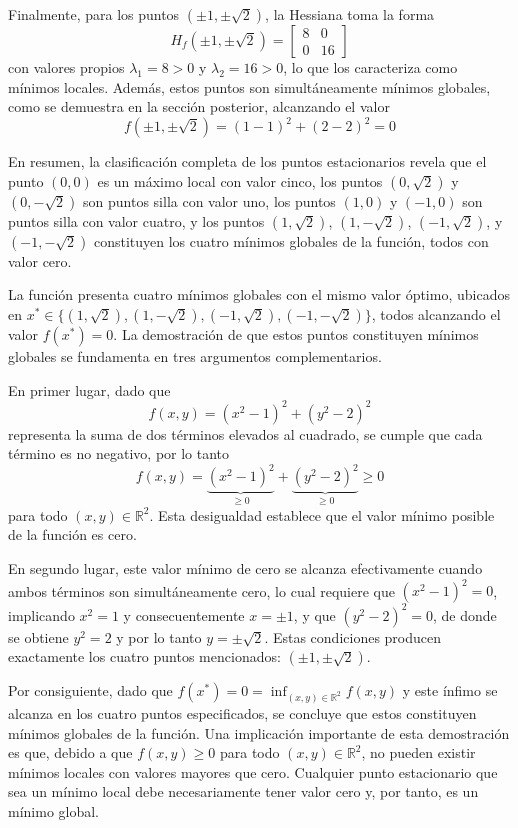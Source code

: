 \documentclass[12pt,a4paper]{article}
\begin{document}
Finalmente, para los puntos $(\pm 1, \pm\sqrt{2})$, la Hessiana toma la forma
\[H_f(\pm 1, \pm\sqrt{2}) = \begin{bmatrix} 8 & 0 \\ 0 & 16 \end{bmatrix}\]
con valores propios $\lambda_1 = 8 > 0$ y $\lambda_2 = 16 > 0$, lo que los caracteriza como mínimos locales. Además, estos puntos son simultáneamente mínimos globales, como se demuestra en la sección posterior, alcanzando el valor
\[f(\pm 1, \pm\sqrt{2}) = (1-1)^2 + (2-2)^2 = 0\]

En resumen, la clasificación completa de los puntos estacionarios revela que el punto $(0, 0)$ es un máximo local con valor cinco, los puntos $(0, \sqrt{2})$ y $(0, -\sqrt{2})$ son puntos silla con valor uno, los puntos $(1, 0)$ y $(-1, 0)$ son puntos silla con valor cuatro, y los puntos $(1, \sqrt{2})$, $(1, -\sqrt{2})$, $(-1, \sqrt{2})$, y $(-1, -\sqrt{2})$ constituyen los cuatro mínimos globales de la función, todos con valor cero.

La función presenta cuatro mínimos globales con el mismo valor óptimo, ubicados en $x^* \in \{(1, \sqrt{2}), (1, -\sqrt{2}), (-1, \sqrt{2}), (-1, -\sqrt{2})\}$, todos alcanzando el valor $f(x^*) = 0$. La demostración de que estos puntos constituyen mínimos globales se fundamenta en tres argumentos complementarios.

En primer lugar, dado que
\[f(x,y) = (x^2-1)^2 + (y^2-2)^2\]
representa la suma de dos términos elevados al cuadrado, se cumple que cada término es no negativo, por lo tanto
\[f(x,y) = \underbrace{(x^2-1)^2}_{\geq 0} + \underbrace{(y^2-2)^2}_{\geq 0} \geq 0\]
para todo $(x,y) \in \mathbb{R}^2$. Esta desigualdad establece que el valor mínimo posible de la función es cero.

En segundo lugar, este valor mínimo de cero se alcanza efectivamente cuando ambos términos son simultáneamente cero, lo cual requiere que $(x^2-1)^2 = 0$, implicando $x^2 = 1$ y consecuentemente $x = \pm 1$, y que $(y^2-2)^2 = 0$, de donde se obtiene $y^2 = 2$ y por lo tanto $y = \pm\sqrt{2}$. Estas condiciones producen exactamente los cuatro puntos mencionados: $(\pm1, \pm\sqrt{2})$.

Por consiguiente, dado que $f(x^*) = 0 = \inf_{(x,y) \in \mathbb{R}^2} f(x,y)$ y este ínfimo se alcanza en los cuatro puntos especificados, se concluye que estos constituyen mínimos globales de la función. Una implicación importante de esta demostración es que, debido a que $f(x,y) \geq 0$ para todo $(x,y) \in \mathbb{R}^2$, no pueden existir mínimos locales con valores mayores que cero. Cualquier punto estacionario que sea un mínimo local debe necesariamente tener valor cero y, por tanto, es un mínimo global.
\end{document}
